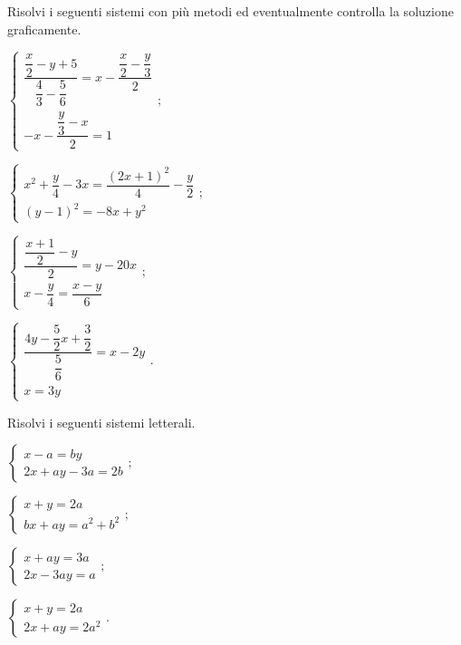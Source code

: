 \begin{esercizio}[\Ast]
 \label{ese:19.78}
 Risolvi i seguenti sistemi con più metodi ed eventualmente controlla
la soluzione graficamente.
\begin{multicols}{2}
\begin{enumeratea}
 {\longarray
\item $\left\{\begin{array}{l}\dfrac{\dfrac{x}{2}-y+5}{\dfrac{4}{3}-\dfrac{5}{6}}=x-\dfrac{\dfrac{x}{2}-\dfrac{y}{3}}{2}\\-x-\dfrac{\dfrac{y}{3}-x}{2}=1\end{array}\right.;$
\item $\left\{\begin{array}{l}x^{2}+\dfrac{y}{4}-3x=\dfrac{(2x+1)^{2}}{4}-\dfrac{y}{2}\\(y-1)^{2}=-8x+y^{2}\end{array}\right.;$
\item $\left\{\begin{array}{l}\dfrac{\dfrac{x+1}{2}-y}{2}=y-20x\\x-\dfrac{y}{4}=\dfrac{x-y}{6}\end{array}\right.;$
\item $\left\{\begin{array}{l}\dfrac{4y-\dfrac{5}{2}x+\dfrac{3}{2}}{\dfrac{5}{6}}=x-2y\\x=3y\end{array}\right..$}
\end{enumeratea}
\end{multicols}
\end{esercizio}

\begin{esercizio}[\Ast] %
 \label{ese:19.79}
 Risolvi i seguenti sistemi letterali.
\begin{multicols}{2}
\begin{enumeratea}
\item $\left\{\begin{array}{l}x-a=by \\2x+ay-3a=2b\end{array}\right.;$
\item $\left\{\begin{array}{l}x+y=2a \\bx+ay=a^{2}+b^{2} \end{array}\right.;$
\item $\left\{\begin{array}{l}x+ay=3a\\2x-3ay=a \end{array}\right.;$
\item $\left\{\begin{array}{l}x+y=2a\\2x+ay=2a^{2} \end{array}\right..$
\end{enumeratea}
\end{multicols}
\end{esercizio}

